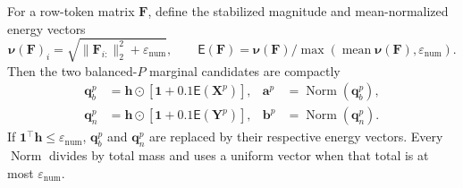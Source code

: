 \documentclass[10pt]{article}
\newcommand{\epsnum}{\varepsilon_{\mathrm{num}}}
\newcommand{\ones}{\bm{1}}
\newcommand{\Norm}{\operatorname{Norm}}
\begin{document}
For a row-token matrix $\bm F$, define the stabilized magnitude and
mean-normalized energy vectors
\begin{equation}
    \bm\nu(\bm F)_i=\sqrt{\|\bm F_{i:}\|_2^2+\epsnum},
    \qquad
    \mathsf E(\bm F)
      =\bm\nu(\bm F)\big/\max(\operatorname{mean}\bm\nu(\bm F),\epsnum).
\end{equation}
Then the two balanced-$P$ marginal candidates are compactly
\begin{equation}
\begin{aligned}
 \bm q_b^p&=\bm h\odot[\ones+0.1\mathsf E(\bm X^p)],&
 \bm a^p&=\Norm(\bm q_b^p),\\
 \bm q_n^p&=\bm h\odot[\ones+0.1\mathsf E(\bm Y^p)],&
 \bm b^p&=\Norm(\bm q_n^p).
\end{aligned}
\label{eq:matrix-p-masses}
\end{equation}
If $\ones^\top\bm h\leq\epsnum$, $\bm q_b^p$ and $\bm q_n^p$ are replaced by
their respective energy vectors.  Every $\Norm$ divides by total mass and uses
a uniform vector when that total is at most $\epsnum$.
\end{document}
